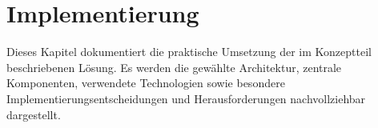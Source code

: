 
\chapter{Implementierung}


Dieses Kapitel dokumentiert die praktische Umsetzung der im Konzeptteil beschriebenen Lösung. Es werden die gewählte Architektur, zentrale Komponenten, verwendete Technologien sowie besondere Implementierungsentscheidungen und Herausforderungen nachvollziehbar dargestellt.




